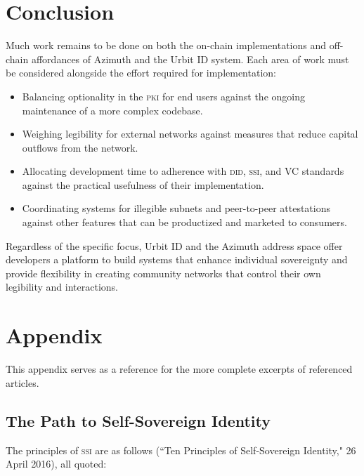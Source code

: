 \documentclass[twoside]{article}
\begin{document}
\section{Conclusion}

Much work remains to be done on both the on-chain implementations and off-chain affordances of Azimuth and the Urbit ID system. Each area of work must be considered alongside the effort required for implementation:

\begin{itemize}
  \item  Balancing optionality in the \textsc{pki} for end users against the ongoing maintenance of a more complex codebase.
  \item  Weighing legibility for external networks against measures that reduce capital outflows from the network.
  \item  Allocating development time to adherence with \textsc{did}, \textsc{ssi}, and VC standards against the practical usefulness of their implementation.
  \item  Coordinating systems for illegible subnets and peer-to-peer attestations against other features that can be productized and marketed to consumers.
\end{itemize}

Regardless of the specific focus, Urbit ID and the Azimuth address space offer developers a platform to build systems that enhance individual sovereignty and provide flexibility in creating community networks that control their own legibility and interactions.\tombstone{}


\section{Appendix}

This appendix serves as a reference for the more complete excerpts of referenced articles.

\subsection{The Path to Self-Sovereign Identity}

The principles of \textsc{ssi} are as follows (``Ten Principles of Self-Sovereign Identity," 26 April 2016), all quoted:
\end{document}
